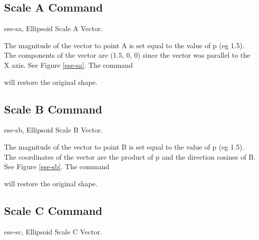 \subsection{Scale A Command}
\mfig ese-sa, Ellipsoid Scale A Vector.


The magnitude of the vector to point A is set equal to the value of p
(eg 1.5).
The components of the vector are (1.5, 0, 0) since the vector was
parallel to the X axis.  See Figure \ref{ese-sa}.  The command


will restore the original shape.

\subsection{Scale B Command}
\mfig ese-sb, Ellipsoid Scale B Vector.


The magnitude of the vector to point B is set equal to the value of p
(eg 1.5).
The coordinates of the vector are the product of p and the
direction cosines of B.  See Figure \ref{ese-sb}.  The command


will restore the original shape.

\subsection{Scale C Command}
\mfig ese-sc, Ellipsoid Scale C Vector.


